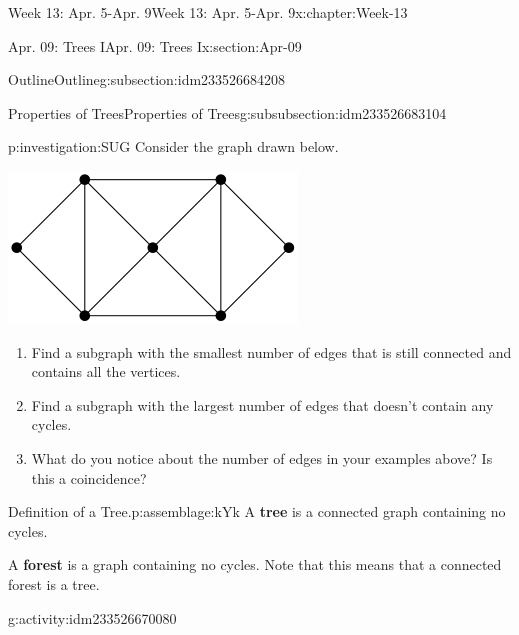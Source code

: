 \documentclass[oneside,10pt,]{book}
\newcommand{\terminology}[1]{\textbf{#1}}
\numberwithin{equation}{section}
\begin{document}
\begin{chapterptx}{Week 13: Apr. 5-Apr. 9}{}{Week 13: Apr. 5-Apr. 9}{}{}{x:chapter:Week-13}
\begin{sectionptx}{Apr. 09: Trees I}{}{Apr. 09: Trees I}{}{}{x:section:Apr-09}
\begin{subsectionptx}{Outline}{}{Outline}{}{}{g:subsection:idm233526684208}
%
\begin{subsubsectionptx}{Properties of Trees}{}{Properties of Trees}{}{}{g:subsubsection:idm233526683104}
\begin{investigation}{}{p:investigation:SUG}%
Consider the graph drawn below.%
\begin{sidebyside}{1}{0.325}{0.325}{0}%
\begin{sbspanel}{0.35}%
\includegraphics[width=\linewidth]{./img/image-107.svg}
\end{sbspanel}%
\end{sidebyside}%
\par
%
\begin{enumerate}
\item{}Find a subgraph with the smallest number of edges that is still connected and contains all the vertices.%
\item{}Find a subgraph with the largest number of edges that doesn't contain any cycles.%
\item{}What do you notice about the number of edges in your examples above?  Is this a coincidence?%
\end{enumerate}
%
\end{investigation}%
\begin{assemblage}{Definition of a Tree.}{p:assemblage:kYk}%
A \terminology{tree} is a connected graph containing no cycles.\footnotemark{}%
\par
A \terminology{forest} is a graph containing no cycles.   Note that this means that a connected forest is a tree.%
\end{assemblage}
%
\begin{activity}{}{g:activity:idm233526670080}%
%
\begin{enumerate}

\end{enumerate}
\end{activity}
\end{subsubsectionptx}
\end{subsectionptx}
\end{sectionptx}
\end{chapterptx}
\end{document}
